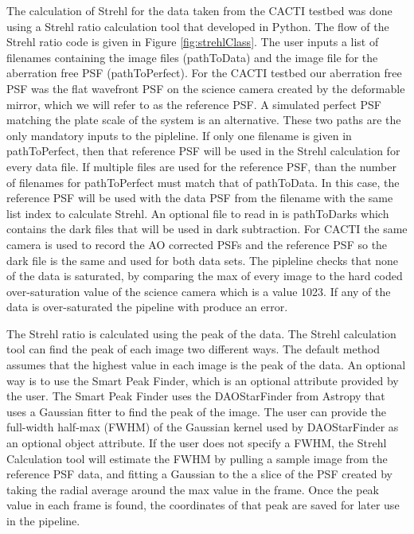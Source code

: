 The calculation of Strehl for the data taken from the CACTI testbed was done using a Strehl ratio calculation tool that developed in Python. The flow of the Strehl ratio code is given in Figure \ref{fig:strehlClass}. The user inputs a list of filenames containing the image files (pathToData) and the image file for the aberration free PSF (pathToPerfect). For the CACTI testbed our aberration free PSF was the flat wavefront PSF on the science camera created by the deformable mirror, which we will refer to as the reference PSF. A simulated perfect PSF matching the plate scale of the system is an alternative. These two paths are the only mandatory inputs to the pipleline. If only one filename is given in pathToPerfect, then that reference PSF will be used in the Strehl calculation for every data file. If multiple files are used for the reference PSF, than the number of filenames for pathToPerfect must match that of pathToData. In this case, the reference PSF will be used with the data PSF from the filename with the same list index to calculate Strehl. An optional file to read in is pathToDarks which contains the dark files that will be used in dark subtraction. For CACTI the same camera is used to record the AO corrected PSFs and the reference PSF so the dark file is the same and used for both data sets. The pipleline checks that none of the data is saturated, by comparing the max of every image to the hard coded over-saturation value of the science camera which is a value 1023. If any of the data is over-saturated the pipeline with produce an error.

The Strehl ratio is calculated using the peak of the data. The Strehl calculation tool can find the peak of each image two different ways. The default method assumes that the highest value in each image is the peak of the data. An optional way is to use the Smart Peak Finder, which is an optional attribute provided by the user. The Smart Peak Finder uses the DAOStarFinder from Astropy that uses a Gaussian fitter to find the peak of the image. The user can provide the full-width half-max (FWHM) of the Gaussian kernel used by DAOStarFinder as an optional object attribute. If the user does not specify a FWHM, the Strehl Calculation tool will estimate the FWHM by pulling a sample image from the reference PSF data, and fitting a Gaussian to the a slice of the PSF created by taking the radial average around the max value in the frame. Once the peak value in each frame is found, the coordinates of that peak are saved for later use in the pipeline. 

